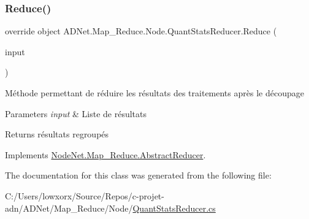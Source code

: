 \subsubsection{\texorpdfstring{Reduce()}{Reduce()}}
{\footnotesize\ttfamily override object A\+D\+Net.\+Map\+\_\+\+Reduce.\+Node.\+Quant\+Stats\+Reducer.\+Reduce (\begin{DoxyParamCaption}\item[{Concurrent\+Bag$<$ object $>$}]{input }\end{DoxyParamCaption})\hspace{0.3cm}{\ttfamily [virtual]}}



Méthode permettant de réduire les résultats des traitements après le découpage 


\begin{DoxyParams}{Parameters}
{\em input} & Liste de résultats\\
\hline
\end{DoxyParams}
\begin{DoxyReturn}{Returns}
résultats regroupés
\end{DoxyReturn}


Implements \hyperlink{class_node_net_1_1_map___reduce_1_1_abstract_reducer_aad995166ff8f13b4c85338bc29d09e62}{Node\+Net.\+Map\+\_\+\+Reduce.\+Abstract\+Reducer}.



The documentation for this class was generated from the following file\+:\begin{DoxyCompactItemize}
\item 
C\+:/\+Users/lowxorx/\+Source/\+Repos/c-\/projet-\/adn/\+A\+D\+Net/\+Map\+\_\+\+Reduce/\+Node/\hyperlink{_quant_stats_reducer_8cs}{Quant\+Stats\+Reducer.\+cs}\end{DoxyCompactItemize}
